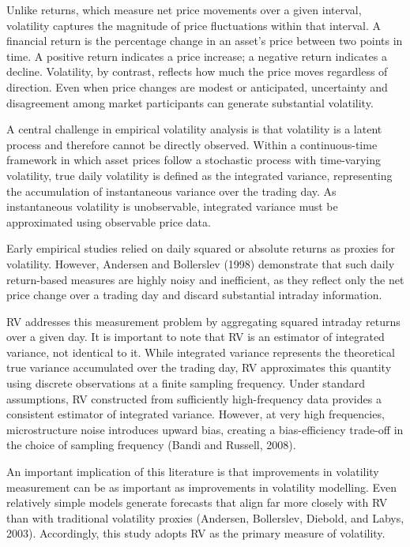 \documentclass[12pt,a4paper]{report}
\begin{document}
Unlike returns, which measure net price movements over a given interval, volatility captures the magnitude of price fluctuations within that interval. A financial return is the percentage change in an asset's price between two points in time. A positive return indicates a price increase; a negative return indicates a decline. Volatility, by contrast, reflects how much the price moves regardless of direction. Even when price changes are modest or anticipated, uncertainty and disagreement among market participants can generate substantial volatility.

A central challenge in empirical volatility analysis is that volatility is a latent process and therefore cannot be directly observed. Within a continuous-time framework in which asset prices follow a stochastic process with time-varying volatility, true daily volatility is defined as the integrated variance, representing the accumulation of instantaneous variance over the trading day. As instantaneous volatility is unobservable, integrated variance must be approximated using observable price data.

Early empirical studies relied on daily squared or absolute returns as proxies for volatility. However, Andersen and Bollerslev (1998) demonstrate that such daily return-based measures are highly noisy and inefficient, as they reflect only the net price change over a trading day and discard substantial intraday information.

RV addresses this measurement problem by aggregating squared intraday returns over a given day. It is important to note that RV is an estimator of integrated variance, not identical to it. While integrated variance represents the theoretical true variance accumulated over the trading day, RV approximates this quantity using discrete observations at a finite sampling frequency. Under standard assumptions, RV constructed from sufficiently high-frequency data provides a consistent estimator of integrated variance. However, at very high frequencies, microstructure noise introduces upward bias, creating a bias-efficiency trade-off in the choice of sampling frequency (Bandi and Russell, 2008).

An important implication of this literature is that improvements in volatility measurement can be as important as improvements in volatility modelling. Even relatively simple models generate forecasts that align far more closely with RV than with traditional volatility proxies (Andersen, Bollerslev, Diebold, and Labys, 2003). Accordingly, this study adopts RV as the primary measure of volatility.
\end{document}
